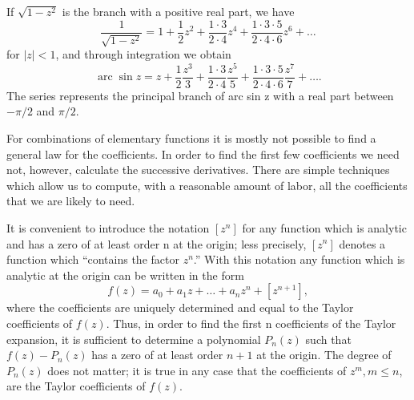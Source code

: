 If $\sqrt{1 - z^2}$ is the branch with a positive real part, we have
\begin{equation*}
\frac {1}{\sqrt {1 - z ^ {2}}} = 1 + \frac {1}{2} z ^ {2} + \frac {1 \cdot 3}{2 \cdot 4} z ^ {4} + \frac {1 \cdot 3 \cdot 5}{2 \cdot 4 \cdot 6} z ^ {6} + \dots
\end{equation*}
for $|z| < 1$, and through integration we obtain
\begin{equation*}
\operatorname{arc} \sin z = z + \frac {1}{2} \frac {z ^ {3}}{3} + \frac {1 \cdot 3}{2 \cdot 4} \frac {z ^ {5}}{5} + \frac {1 \cdot 3 \cdot 5}{2 \cdot 4 \cdot 6} \frac {z ^ {7}}{7} + \dots .
\end{equation*}
The series represents the principal branch of arc sin z with a real part between $-\pi/2$ and $\pi/2$.

For combinations of elementary functions it is mostly not possible to find a general law for the coefficients. In order to find the first few coefficients we need not, however, calculate the successive derivatives. There are simple techniques which allow us to compute, with a reasonable amount of labor, all the coefficients that we are likely to need.

It is convenient to introduce the notation $[z^{n}]$ for any function which is analytic and has a zero of at least order n at the origin; less precisely, $[z^{n}]$ denotes a function which “contains the factor $z^{n}$.” With this notation any function which is analytic at the origin can be written in the form
\begin{equation*}
f (z) = a _ {0} + a _ {1} z + \dots + a _ {n} z ^ {n} + [ z ^ {n + 1} ],
\end{equation*}
where the coefficients are uniquely determined and equal to the Taylor coefficients of $f(z)$. Thus, in order to find the first n coefficients of the Taylor expansion, it is sufficient to determine a polynomial $P_{n}(z)$ such
that $f(z) - P_n(z)$ has a zero of at least order $n + 1$ at the origin. The degree of $P_n(z)$ does not matter; it is true in any case that the coefficients of $z^m, m \leq n$, are the Taylor coefficients of $f(z)$.

